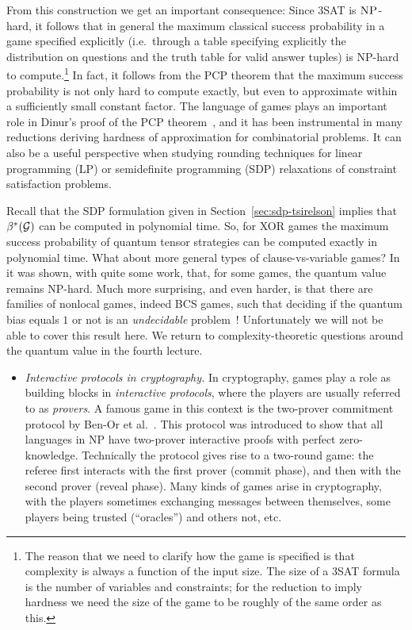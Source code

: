 From this construction we get an important consequence: Since $3$SAT is $\textsc{NP}$-hard, it follows that in general the maximum classical success probability in a game specified explicitly (i.e.\ through a table specifying explicitly the distribution on questions and the truth table for valid answer tuples) is NP-hard to compute.\footnote{The reason that we need to clarify how the game is specified is that complexity is always a function of the input size. The size of a $3$SAT formula is the number of variables and constraints; for the reduction to imply hardness we need the size of the game to be roughly of the same order as this.}
In fact, it follows from the PCP theorem that the maximum success probability is not only hard to compute exactly, but even to approximate within a sufficiently small constant factor. The language of games plays an important role in 
Dinur's proof of the PCP theorem~\cite{dinur2007pcp}, and it has been instrumental in many reductions deriving hardness of approximation for combinatorial problems. It can also be a useful perspective when studying rounding techniques for linear programming (LP) or semidefinite programming (SDP) relaxations of constraint satisfaction problems. 


Recall that the SDP formulation given in Section~\ref{sec:sdp-tsirelson} implies that $\beta^*(\mathcal{G})$ can be computed in polynomial time. So, for XOR games the maximum success probability of quantum tensor strategies can be computed exactly in polynomial time. What about more general types of clause-vs-variable games? In~\cite{kempe2011entangled,ito2009oracularization} it was shown, with quite some work, that, for some games, the quantum value remains NP-hard. Much more surprising, and even harder, is that there are families of nonlocal games, indeed BCS games, such that deciding if the quantum bias equals $1$ or not is an \emph{undecidable} problem~\cite{slofstra2019set}! Unfortunately we will not be able to cover this result here. We return to complexity-theoretic questions around the quantum value in the fourth lecture. 

\begin{itemize}
\item \emph{Interactive protocols in cryptography.} In cryptography, games play a role as building blocks in \emph{interactive protocols}, where the players are usually referred to as \emph{provers}. A famous game in this context is the two-prover commitment protocol by Ben-Or et al.~\cite{ben1988multi}. This protocol was introduced to show that all languages in NP have two-prover interactive proofs with perfect zero-knowledge. Technically the protocol gives rise to a two-round game: the referee first interacts with the first prover (commit phase), and then with the second prover (reveal phase). Many kinds of games arise in cryptography, with the players sometimes exchanging messages between themselves, some players being trusted (``oracles'') and others not, etc. 
\end{itemize}





